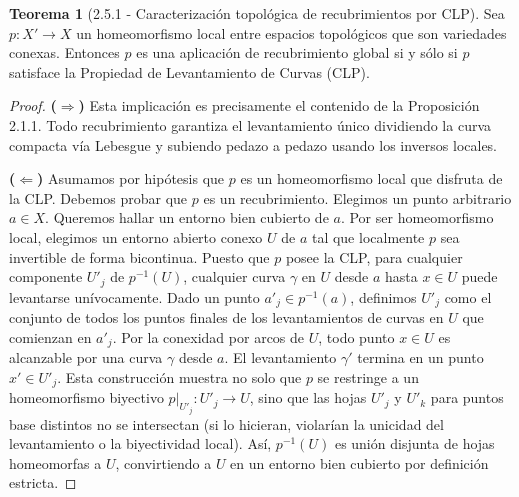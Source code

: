 \documentclass[11pt,a4paper]{article}
\theoremstyle{definition}
\newtheorem{teorema}{Teorema}[section]
\theoremstyle{remark}
\numberwithin{equation}{section}
\begin{document}
\begin{teorema}[2.5.1 - Caracterización topológica de recubrimientos por CLP]
Sea $p : X' \to X$ un homeomorfismo local entre espacios topológicos que son variedades conexas. Entonces $p$ es una aplicación de recubrimiento global si y sólo si $p$ satisface la Propiedad de Levantamiento de Curvas (CLP).
\end{teorema}
\begin{proof}
\textbf{($\Longrightarrow$)} Esta implicación es precisamente el contenido de la Proposición 2.1.1. Todo recubrimiento garantiza el levantamiento único dividiendo la curva compacta vía Lebesgue y subiendo pedazo a pedazo usando los inversos locales.

\textbf{($\Longleftarrow$)} Asumamos por hipótesis que $p$ es un homeomorfismo local que disfruta de la CLP. Debemos probar que $p$ es un recubrimiento. Elegimos un punto arbitrario $a \in X$. Queremos hallar un entorno bien cubierto de $a$. 
Por ser homeomorfismo local, elegimos un entorno abierto conexo $U$ de $a$ tal que localmente $p$ sea invertible de forma bicontinua. 
Puesto que $p$ posee la CLP, para cualquier componente $U'_j$ de $p^{-1}(U)$, cualquier curva $\gamma$ en $U$ desde $a$ hasta $x \in U$ puede levantarse unívocamente. 
Dado un punto $a'_j \in p^{-1}(a)$, definimos $U'_j$ como el conjunto de todos los puntos finales de los levantamientos de curvas en $U$ que comienzan en $a'_j$. 
Por la conexidad por arcos de $U$, todo punto $x \in U$ es alcanzable por una curva $\gamma$ desde $a$. El levantamiento $\gamma'$ termina en un punto $x' \in U'_j$. Esta construcción muestra no solo que $p$ se restringe a un homeomorfismo biyectivo $p|_{U'_j} : U'_j \to U$, sino que las hojas $U'_j$ y $U'_k$ para puntos base distintos no se intersectan (si lo hicieran, violarían la unicidad del levantamiento o la biyectividad local). Así, $p^{-1}(U)$ es unión disjunta de hojas homeomorfas a $U$, convirtiendo a $U$ en un entorno bien cubierto por definición estricta.
\end{proof}
\end{document}
